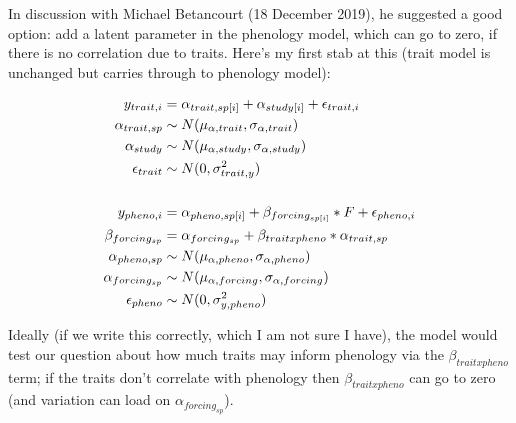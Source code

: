 \documentclass[11pt,letter]{article}
\begin{document}
In discussion with Michael Betancourt (18 December 2019), he suggested a good option: add a latent parameter in the phenology model, which can go to zero, if there is no correlation due to traits. Here's my first stab at this (trait model is unchanged but carries through to phenology model):

\begin{align*}
y_{trait, i} &= \alpha_{trait, sp[i]} + \alpha_{study[i]} + \epsilon_{trait, i}\\
\alpha_{trait, sp} & \sim N(\mu_{\alpha, trait}, \sigma_{\alpha, trait}) \\
\alpha_{study}  & \sim N(\mu_{\alpha, study}, \sigma_{\alpha, study})\\
\epsilon_{trait} & \sim N(0,\sigma^2_{trait, y}) \\
\vspace{1ex}\\
y_{pheno, i} &= \alpha_{pheno, sp[i]} + \beta_{forcing_{sp[i]}}*F + \epsilon_{pheno, i}\\
\beta_{forcing_{sp}} & = \alpha_{forcing_{sp}} + \beta_{trait x pheno}*\alpha_{trait, sp} \\
\alpha_{pheno, sp} & \sim N(\mu_{\alpha, pheno}, \sigma_{\alpha, pheno}) \\
\alpha_{forcing_{sp}} & \sim N(\mu_{\alpha, forcing}, \sigma_{\alpha, forcing})\\
\epsilon_{pheno} & \sim N(0,\sigma^2_{y, pheno}) 
\end{align*}

Ideally (if we write this correctly, which I am not sure I have), the model would test our question about how much traits may inform phenology via the $\beta_{trait x pheno}$ term; if the traits don't correlate with phenology then $\beta_{trait x pheno}$ can go to zero (and variation can load on $\alpha_{forcing_{sp}}$).
\end{document}
